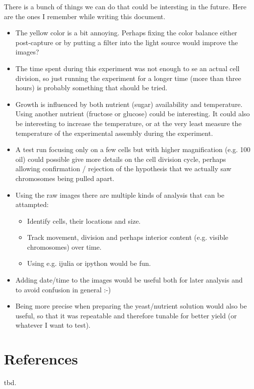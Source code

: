 \documentclass[12pt]{article}
\begin{document}
There is a bunch of things we can do that could be intersting in the
future. Here are the ones I remember while writing this document.

\begin{itemize}
\item The yellow color is a bit annoying.  Perhaps fixing the color
  balance either post-capture or by putting a filter into the
  light source would improve the images?
\item The time spent during this experiment was not enough to 
  se an actual cell division, so just running the experiment for 
  a longer time (more than three hours) is probably something that
 should be tried.
\item Growth is influenced by both nutrient (sugar) availability and
  temperature.   Using another nutrient (fructose or glucose) could
  be interesting.  It could also be interesting to increase the
  temperature, or at the very least measure the temperature of the
  experimental assembly during the experiment.
\item A test run focusing only on a few cells but with higher
  magnification (e.g. 100 oil) could possible give more details on the cell division
  cycle, perhaps allowing confirmation / rejection of the hypothesis
  that we actually saw chromosomes being pulled apart.
\item Using the raw images there are multiple kinds of analysis that
  can be attampted:
\begin{itemize}
 \item Identify cells, their locations and size.
 \item Track movement, division and perhaps interior content
   (e.g. visible chromosomes) over time.
 \item Using e.g. ijulia or ipython would be fun.
\end{itemize}
\item Adding date/time to the images would be useful both for later
  analysis and to avoid confusion in general :-)
\item Being more precise when preparing the yeast/nutrient solution
  would also be useful, so that it was repeatable and therefore
  tunable for better yield (or whatever I want to test).
\end{itemize}




\section{References}


tbd.
\end{document}
